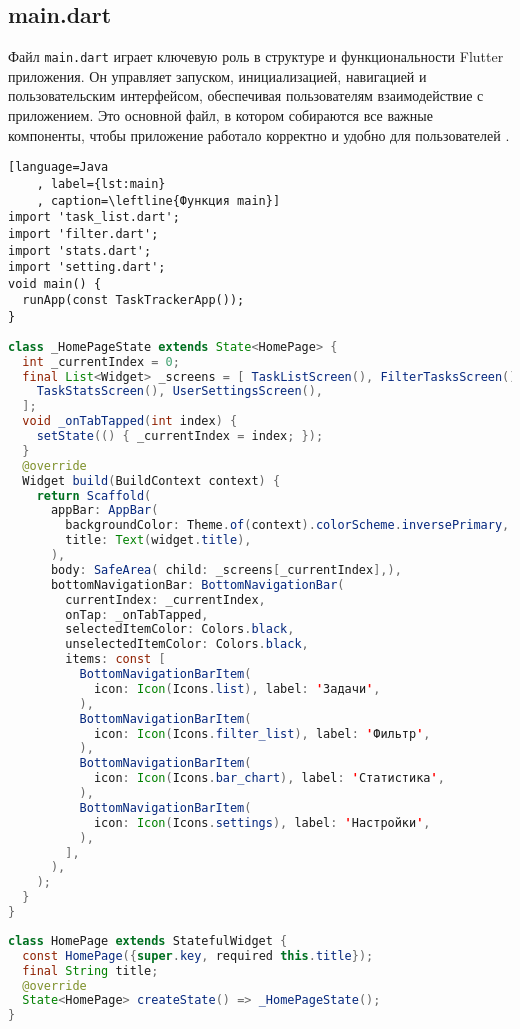\subsection{main.dart}

Файл \texttt{main.dart} играет ключевую роль в структуре
и функциональности Flutter приложения.
Он управляет запуском, инициализацией, навигацией
и пользовательским интерфейсом, обеспечивая пользователям взаимодействие
с приложением.
Это основной файл, в котором собираются все важные компоненты,
чтобы приложение работало корректно и удобно для пользователей
.

\begin{lstlisting}[language=Java
	, label={lst:main}
	, caption=\leftline{Функция main}]
import 'task_list.dart';
import 'filter.dart';
import 'stats.dart';
import 'setting.dart';
void main() {
  runApp(const TaskTrackerApp());
}
\end{lstlisting}

\break

\begin{lstlisting}[language=Java
	, caption=\leftline{Класс \_HomePageState}]
class _HomePageState extends State<HomePage> {
  int _currentIndex = 0;
  final List<Widget> _screens = [ TaskListScreen(), FilterTasksScreen(),
    TaskStatsScreen(), UserSettingsScreen(),
  ];
  void _onTabTapped(int index) {
    setState(() { _currentIndex = index; });
  }
  @override
  Widget build(BuildContext context) {
    return Scaffold(
      appBar: AppBar(
        backgroundColor: Theme.of(context).colorScheme.inversePrimary,
        title: Text(widget.title),
      ),
      body: SafeArea( child: _screens[_currentIndex],),
      bottomNavigationBar: BottomNavigationBar(
        currentIndex: _currentIndex,
        onTap: _onTabTapped,
        selectedItemColor: Colors.black,
        unselectedItemColor: Colors.black,
        items: const [
          BottomNavigationBarItem(
            icon: Icon(Icons.list), label: 'Задачи',
          ),
          BottomNavigationBarItem(
            icon: Icon(Icons.filter_list), label: 'Фильтр',
          ),
          BottomNavigationBarItem(
            icon: Icon(Icons.bar_chart), label: 'Статистика',
          ),
          BottomNavigationBarItem(
            icon: Icon(Icons.settings), label: 'Настройки',
          ),
        ],
      ),
    );
  }
}
\end{lstlisting}

\begin{lstlisting}[language=Java
	, caption=\leftline{Класс HomePage}]
class HomePage extends StatefulWidget {
  const HomePage({super.key, required this.title});
  final String title;
  @override
  State<HomePage> createState() => _HomePageState();
}
\end{lstlisting}

